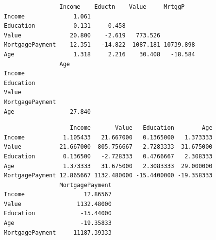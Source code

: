 \begin{Shaded}
\begin{Highlighting}[]
\OperatorTok{$}
\end{Highlighting}
\end{Shaded}

\begin{verbatim}
                Income    Eductn    Value     MrtggP   
Income              1.061                              
Education           0.131     0.458                    
Value              20.800    -2.619   773.526          
MortgagePayment    12.351   -14.822  1087.181 10739.898
Age                 1.318     2.216    30.408   -18.584
                Age      
Income                   
Education                
Value                    
MortgagePayment          
Age                27.840
\end{verbatim}

\begin{Shaded}
\begin{Highlighting}[]
\end{Highlighting}
\end{Shaded}

\begin{verbatim}
                   Income       Value   Education        Age
Income           1.105433   21.667000   0.1365000   1.373333
Value           21.667000  805.756667  -2.7283333  31.675000
Education        0.136500   -2.728333   0.4766667   2.308333
Age              1.373333   31.675000   2.3083333  29.000000
MortgagePayment 12.865667 1132.480000 -15.4400000 -19.358333
                MortgagePayment
Income                 12.86567
Value                1132.48000
Education             -15.44000
Age                   -19.35833
MortgagePayment     11187.39333
\end{verbatim}

\begin{Shaded}
\begin{Highlighting}[]


\NormalTok{(}
\NormalTok{  , } 
\NormalTok{  , } 
\NormalTok{  , } 
\NormalTok{  , } 
\NormalTok{  , } 
\NormalTok{  , } 
\NormalTok{  , } 
\NormalTok{  , } 
\NormalTok{  , } 
\NormalTok{  , }
\NormalTok{)}
\end{Highlighting}
\end{Shaded}

